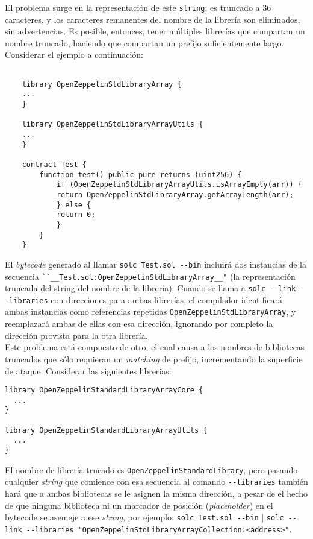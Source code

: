 El problema surge en la representación de este \texttt{string}: es truncado a 36 caracteres, y los caracteres remanentes del nombre de la librería son eliminados, sin advertencias. Es posible, entonces, tener múltiples librerías que compartan un nombre truncado, haciendo que compartan un prefijo suficientemente largo. Considerar el ejemplo a continuación:

\begin{lstlisting}[language=Solidity, caption={Código de ejemplo para inyección de direcciones}]
    
    library OpenZeppelinStdLibraryArray {
    ...
    }

    library OpenZeppelinStdLibraryArrayUtils {
    ...
    }

    contract Test {
        function test() public pure returns (uint256) {
            if (OpenZeppelinStdLibraryArrayUtils.isArrayEmpty(arr)) {
            return OpenZeppelinStdLibraryArray.getArrayLength(arr);
            } else {
            return 0;
            }   
        }
    }
\end{lstlisting}
\bigskip

El \textit{bytecode} generado al llamar \verb|solc Test.sol --bin| incluirá dos instancias de la secuencia \verb|``__Test.sol:OpenZeppelinStdLibraryArray__"| (la representación truncada del string del nombre de la librería). Cuando se llama a \verb|solc --link --libraries| con direcciones para ambas librerías, el compilador identificará ambas instancias como referencias repetidas \texttt{OpenZeppelin\-Std\-Library\-Array}, y reemplazará ambas de ellas con esa dirección, ignorando por completo la dirección provista para la otra librería.\\

Este problema está compuesto de otro, el cual causa a los nombres de bibliotecas truncados que sólo requieran un \textit{matching} de prefijo, incrementando la superficie de ataque. Considerar las siguientes librerías:

\begin{lstlisting}[language=Solidity, caption={Código librerías ejemplo}]
library OpenZeppelinStandardLibraryArrayCore {
  ...
}

library OpenZeppelinStandardLibraryArrayUtils {
  ...
}
\end{lstlisting}
\bigskip

El nombre de librería trucado es \verb|OpenZeppelinStandardLibrary|, pero pasando cualquier \textit{string} que comience con esa secuencia al comando \verb|--libraries| también hará que a ambas bibliotecas se le asignen la misma dirección, a pesar de el hecho de que ninguna biblioteca ni un marcador de posición (\textit{placeholder}) en el bytecode se asemeje a ese \textit{string}, por ejemplo: \verb|solc Test.sol --bin| $\vert$ \verb|solc --link --libraries "OpenZeppelinStdLibraryArrayCollection:<address>"|.\\

